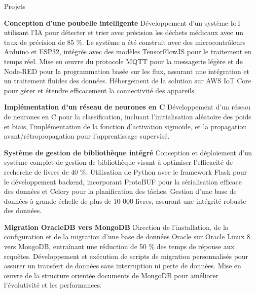 \documentclass{resume}
\begin{document}
\begin{rSection}{Projets}
\vspace{-1.25em}
    \item \textbf{Conception d'une poubelle intelligente} Développement d'un système IoT utilisant l'IA pour détecter et trier avec précision les déchets médicaux avec un taux de précision de 85 \%. Le système a été construit avec des microcontrôleurs Arduino et ESP32, intégrés avec des modèles TensorFlowJS pour le traitement en temps réel. Mise en œuvre du protocole MQTT pour la messagerie légère et de Node-RED pour la programmation basée sur les flux, assurant une intégration et un traitement fluides des données. Hébergement de la solution sur AWS IoT Core pour gérer et étendre efficacement la connectivité des appareils.
    
    \item \textbf{Implémentation d'un réseau de neurones en C} Développement d'un réseau de neurones en C pour la classification, incluant l'initialisation aléatoire des poids et biais, l'implémentation de la fonction d'activation sigmoïde, et la propagation avant/rétropropagation pour l'apprentissage supervisé.
    
    \item \textbf{Système de gestion de bibliothèque intégré} Conception et déploiement d'un système complet de gestion de bibliothèque visant à optimiser l'efficacité de recherche de livres de 40 \%. Utilisation de Python avec le framework Flask pour le développement backend, incorporant ProtoBUF pour la sérialisation efficace des données et Celery pour la planification des tâches. Gestion d'une base de données à grande échelle de plus de 10 000 livres, assurant une intégrité robuste des données.
    
    \item \textbf{Migration OracleDB vers MongoDB} Direction de l'installation, de la configuration et de la migration d'une base de données Oracle sur Oracle Linux 8 vers MongoDB, entraînant une réduction de 50 \% des temps de réponse aux requêtes. Développement et exécution de scripts de migration personnalisés pour assurer un transfert de données sans interruption ni perte de données. Mise en œuvre de la structure orientée documents de MongoDB pour améliorer l'évolutivité et les performances.
    

\end{rSection}
\end{document}
